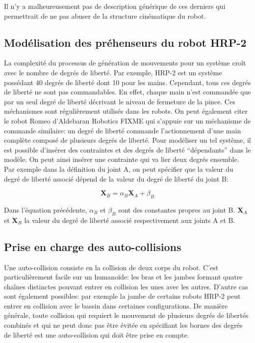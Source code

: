 Il n'y a malheureusement pas de description générique de ces derniers
qui permettrait de ne pas abuser de la structure cinématique du robot.


\subsection{Modélisation des préhenseurs du robot HRP-2}

La complexité du processus de génération de mouvements pour un système
croît avec le nombre de degrés de liberté. Par exemple, HRP-2 est un
système possédant 40 degrés de liberté dont 10 pour les
mains. Cependant, tous ces degrés de liberté ne sont pas
commandables. En effet, chaque main n'est commandée que par un seul
degré de liberté décrivant le niveau de fermeture de la pince. Ces
méchanismes sont régulièrement utilisés dans les robots. On peut
également citer le robot Romeo d'Aldebaran Robotics FIXME qui s'appuie
sur un méchanisme de commande similaire: un degré de liberté commande
l'actionnement d'une main complète composé de plusieurs degrés de
liberté. Pour modéliser un tel système, il est possible d'insérer des
contraintes et des degrés de liberté ``dépendants'' dans le modèle. On
peut ainsi insérer une contrainte qui va lier deux degrés
ensemble. Par exemple dans la définition du joint A, on peut spécifier
que la valeur du degré de liberté associé dépend de la valeur du degré
de liberté du joint B:

\begin{equation}
  \mathbf{X}_B = \alpha_B \mathbf{X}_A + \beta_B
\end{equation}

Dans l'équation précédente, $\alpha_B$ et $\beta_B$ sont des
constantes propres au joint B. $\mathbf{X}_A$ et $\mathbf{X}_B$ la
valeur du degré de liberté associé respectivement aux joints A et B.


\subsection{Prise en charge des auto-collisions}

Une auto-collision consiste en la collision de deux corps du
robot. C'est particulièrement facile sur un humanoïde: les bras et les
jambes formant quatre chaînes distinctes pouvant entrer en collision
les unes avec les autres. D'autre cas sont également possibles: par
exemple la jambe de certains robots HRP-2 peut entrer en collision
avec le bassin dans certaines configurations. De manière générale,
toute collision qui requiert le mouvement de plusieurs degrés de
libertés combinés et qui ne peut donc pas être évitée en spécifiant
les bornes des degrés de liberté est une auto-collision qui doit être
prise en compte.

